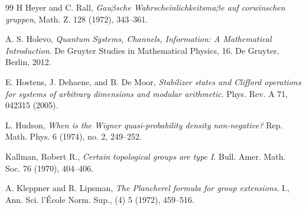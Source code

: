 \documentclass[12pt,reqno]{amsart}
\theoremstyle{definition}
\theoremstyle{definition}
\theoremstyle{definition}
\numberwithin{thm}{section}
\numberwithin{equation}{section}
\newcommand{\Real}{\mathbb R}
\begin{document}
\begin{thebibliography}{99}
H Heyer and C. Rall, 
\textit{Gau$\beta$sche Wahrscheinlichkeitsma$\beta$e auf corwinschen gruppen}, 
Math. Z. 128 (1972), 343--361.




 A. S. Holevo, 
\textit{Quantum Systems, Channels, Information: A Mathematical Introduction}.
De Gruyter Studies in Mathematical Physics, 16. De Gruyter, Berlin, 2012.


 E. Hostens, J. Dehaene, and B. De Moor,
\textit{Stabilizer states and Clifford operations for systems of arbitrary dimensions and modular arithmetic}.
Phys. Rev. A 71, 042315 (2005).

 L. Hudson, 
\textit{When is the Wigner quasi-probability density non-negative?}
Rep. Math. Phys. 6 (1974), no. 2, 249--252.




Kallman, Robert R.,
\textit{Certain topological groups are type I}. Bull. Amer. Math. Soc. 76 (1970), 404--406.

A. Kleppner and R. Lipsman,
\textit{The Plancherel formula for group extensions}.
I., Ann. Sci. l'\'{E}cole Norm. Sup., (4) 5 (1972), 459--516.





\end{thebibliography}
\end{document}
